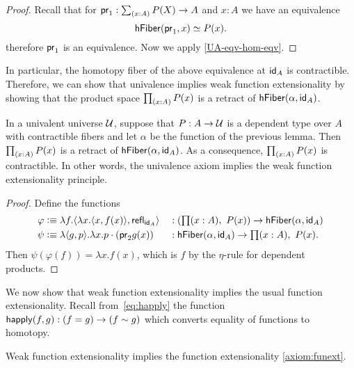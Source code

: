 \begin{proof}
  Recall that for $\proj{1}:\sm{x:A}P(X)\to A$ and $x:A$ we have an equivalence
  \begin{equation*}
    \eqv{\hfiber{\proj{1}}{x}}{P(x)}.
  \end{equation*}
  therefore $\proj{1}$ is an equivalence. Now we apply \autoref{UA-eqv-hom-eqv}.
\end{proof}

In particular, the homotopy fiber of the above equivalence at $\idfunc[A]$ is contractible. Therefore, we can show that univalence implies weak function extensionality by showing that the product space $\prd{x:A}P(x)$ is a retract of $\hfiber{\alpha}{\idfunc[A]}$.

\begin{thm}
In a univalent universe $\type$, suppose that $P:A\to\type$ is a dependent type over $A$ with contractible fibers and let $\alpha$ be the function of the previous lemma. Then $\prd{x:A}P(x)$ is a retract of $\hfiber{\alpha}{\idfunc[A]}$. As a consequence, $\prd{x:A}P(x)$ is contractible. In other words, the univalence axiom implies the weak function extensionality principle.
\end{thm}

\begin{proof}
Define the functions
\begin{align*}
\varphi & \defeq \lambda f.\langle\lambda x.\langle x,f(x)\rangle,\refl{\idfunc[A]}\rangle & & : (\prd{x:A}P(x))\to\hfiber{\alpha}{\idfunc[A]}\\
\psi & \defeq \lambda\langle g,p\rangle.\lambda x.p\cdot(\proj{2} g(x)) & & :
 \hfiber{\alpha}{\idfunc[A]}\to \prd{x:A}P(x) .
\end{align*}
Then $\psi(\varphi(f))=\lambda x.f(x)$, which is $f$ by the $\eta$-rule for dependent products.
\end{proof}

We now show that weak function extensionality implies the usual function extensionality.
Recall from~\eqref{eq:happly} the function $\happly (f,g) : (f = g)\to(f\htpy g)$ which
converts equality of functions to homotopy.

\begin{thm}
Weak function extensionality implies the function extensionality \autoref{axiom:funext}.
\end{thm}

